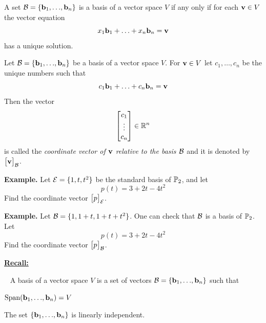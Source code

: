 {\newpage

\begin{cbox}[Theorem]
A set ${\mathcal B} = \{{\bf b}_{1}, {\dots}, {\bf b}_{n}\}$ is a basis of a vector space $V$ if any only if
for each ${\bf v}\in V$ the vector equation 
$$x_{1}{\bf b}_{1} + {\dots} + x_{n}{\bf b}_{n} = {\bf v}$$
has a unique solution. 
\end{cbox}


\vfill

\begin{cbox}[Definition]
Let ${\mathcal B} = \{{\bf b}_{1}, {\dots}, {\bf b}_{n}\}$ be a basis of a vector space $V$. 
For  ${\bf v}\in V$ let $c_{1}, \dots, c_{n}$ be the unique numbers such that 
$$c_{1}{\bf b}_{1} + {\dots} + c_{n}{\bf b}_{n} = {\bf v}$$
Then the vector
$$
\begin{bmatrix}
c_{1} \\
\vdots \\
c_{n}  \\
\end{bmatrix}
\in {\mathbb R}^{n}
$$
is called the \emph{coordinate vector of ${\bf v}$ relative to the basis ${\mathcal B}$} and it is denoted by 
$\begin{bmatrix}{\bf v}\end{bmatrix}_{{\mathcal B}}$. 
\end{cbox}

\newpage

{\bf Example.} Let ${\mathcal E} = \{1, t, t^{2}\}$ be the standard basis of ${\mathbb P}_{2}$, and let 
$$p(t) = 3+2t -4t^{2}$$
Find the coordinate vector $\begin{bmatrix}p\end{bmatrix}_{{\mathcal E}}$. 

\vskip 70mm

{\bf Example.} Let ${\mathcal B} = \{1, 1+t, 1+t+t^{2}\}$. One can check that ${\mathcal B}$ is a basis of ${\mathbb P}_{2}$. Let 
$$p(t) = 3+2t -4t^{2}$$
Find the coordinate vector $\begin{bmatrix}p\end{bmatrix}_{{\mathcal B}}$. 



\underline{\bf Recall:}

\vskip 5mm

{\textbullet\ } A basis of a vector space $V$ is a set of vectors ${\mathcal B} = \{{\bf b}_{1}, {\dots}, {\bf b}_{n}\}$ such that
\benu
\item[\bf 1)]  $\text{Span}({\bf b}_{1}, {\dots}, {\bf b}_{n}) = V$ \\[-4mm]
\item[\bf 2)]  The set $\{{\bf b}_{1}, {\dots}, {\bf b}_{n}\}$ is linearly independent. 
\eenu


}
